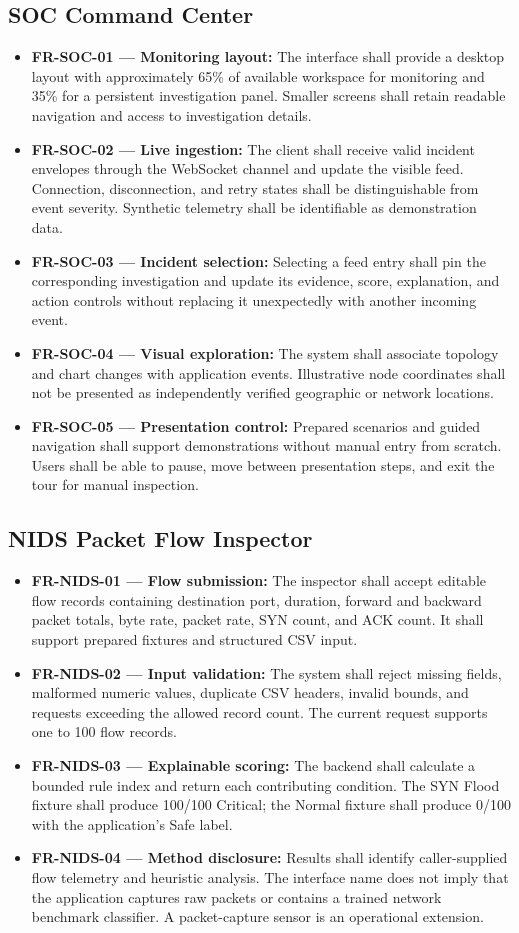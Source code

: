 \documentclass[12pt,a4paper,oneside]{report}
\newcommand{\req}[2]{\item \textbf{#1:} #2}
\begin{document}
\subsection{SOC Command Center}
\begin{itemize}
\req{FR-SOC-01 --- Monitoring layout}{The interface shall provide a desktop layout with approximately 65\% of available workspace for monitoring and 35\% for a persistent investigation panel. Smaller screens shall retain readable navigation and access to investigation details.}
\req{FR-SOC-02 --- Live ingestion}{The client shall receive valid incident envelopes through the WebSocket channel and update the visible feed. Connection, disconnection, and retry states shall be distinguishable from event severity. Synthetic telemetry shall be identifiable as demonstration data.}
\req{FR-SOC-03 --- Incident selection}{Selecting a feed entry shall pin the corresponding investigation and update its evidence, score, explanation, and action controls without replacing it unexpectedly with another incoming event.}
\req{FR-SOC-04 --- Visual exploration}{The system shall associate topology and chart changes with application events. Illustrative node coordinates shall not be presented as independently verified geographic or network locations.}
\req{FR-SOC-05 --- Presentation control}{Prepared scenarios and guided navigation shall support demonstrations without manual entry from scratch. Users shall be able to pause, move between presentation steps, and exit the tour for manual inspection.}
\end{itemize}

\subsection{NIDS Packet Flow Inspector}
\begin{itemize}
\req{FR-NIDS-01 --- Flow submission}{The inspector shall accept editable flow records containing destination port, duration, forward and backward packet totals, byte rate, packet rate, SYN count, and ACK count. It shall support prepared fixtures and structured CSV input.}
\req{FR-NIDS-02 --- Input validation}{The system shall reject missing fields, malformed numeric values, duplicate CSV headers, invalid bounds, and requests exceeding the allowed record count. The current request supports one to 100 flow records.}
\req{FR-NIDS-03 --- Explainable scoring}{The backend shall calculate a bounded rule index and return each contributing condition. The SYN Flood fixture shall produce 100/100 Critical; the Normal fixture shall produce 0/100 with the application's Safe label.}
\req{FR-NIDS-04 --- Method disclosure}{Results shall identify caller-supplied flow telemetry and heuristic analysis. The interface name does not imply that the application captures raw packets or contains a trained network benchmark classifier. A packet-capture sensor is an operational extension.}
\end{itemize}
\end{document}

